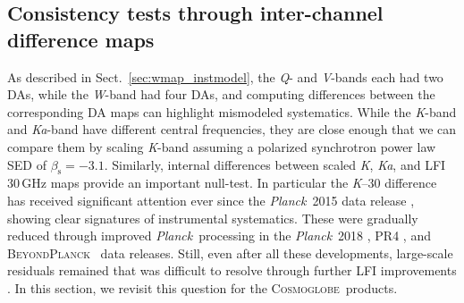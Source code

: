 \documentclass[twocolumn]{../../common/aa}
\def\WMAP{\emph{WMAP}}
\def\WMAPnine{\emph{WMAP9}}
\def\Planck{\emph{Planck}}
\newcommand{\bp}{\textsc{BeyondPlanck}}
\newcommand{\cosmoglobe}{\textsc{Cosmoglobe}}
\newcommand{\K}[0]{\textit K}
\newcommand{\Ka}[0]{\textit{Ka}}
\newcommand{\Q}[0]{\textit Q}
\newcommand{\V}[0]{\textit V}
\newcommand{\W}[0]{\textit W}
\begin{document}












\subsection{Consistency tests through inter-channel difference maps}
\label{sec:internal_consistency}

As described in Sect.~\ref{sec:wmap_instmodel}, the \Q- and \V-bands each had two DAs, while the \W-band had four DAs, and computing differences between the corresponding DA maps can highlight mismodeled systematics. While the \K-band and \Ka-band have different central frequencies, they are close enough that we can compare them by scaling \K-band assuming a polarized synchrotron power law SED of $\beta_\mathrm s=-3.1$. Similarly, internal differences between scaled \K, \Ka, and LFI 30\,GHz maps provide an important null-test. In particular the \K--30 difference has received significant attention ever since the \Planck\ 2015 data release \citep{planck2014-a01}, showing clear signatures of instrumental systematics. These were gradually reduced through improved \Planck\ processing in the \Planck\ 2018 \citep{planck2016-l02}, PR4 \citep{npipe}, and \bp\ \citep{bp01} data releases. Still, even after all these developments, large-scale residuals remained that was difficult to resolve through further LFI improvements \citep{bp07}. In this section, we revisit this question for the \cosmoglobe\ products.
\end{document}
